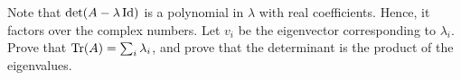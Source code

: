 \documentclass{article}
\begin{document}
	\begin{exercise}
		Note that $\det(A-\lambda\operatorname{Id})$ is a polynomial in $\lambda$ with real coefficients. Hence, it factors over the complex numbers. Let $v_i$ be the eigenvector corresponding to $\lambda_i$. Prove that $\operatorname{Tr}(A) = \sum_i \lambda_i$, and prove that the determinant is the product of the eigenvalues.
	\end{exercise}

	
\end{document}
